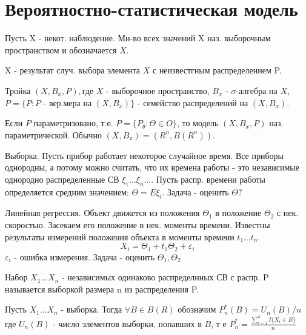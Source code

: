 	\section{Вероятностно-статистическая модель}
	
	\begin{definition}
		Пусть X - некот. наблюдение. Мн-во всех значений X наз. выборочным пространством и обозначается $X$.
	\end{definition}
	X - результат случ. выбора элемента $X$ с неизвестгным распределением P.
	
	\begin{definition}
		Тройка $(X, B_x, P), $где $X$ - выборочное пространство, $B_x$ - $\sigma$-алгебра на $X$,
		$P = \{P: P$ - вер.мера на $(X, B_x)\}$ - семейство распределений  на $(X, B_x)$.
		
	\end{definition}
	
	Если $P$ параметризовано, т.е. $P = \{P_\theta: \Theta \in O\}$, то модель $(X,B_x,P)$ наз. параметрической.
	Обычно $(X,B_x)=(R^n,B(R^n))$.
	
	\begin{example}
			Выборка. Пусть прибор работает некоторое случайное время. Все приборы однородны, а потому можно считать, что их времена работы - 
			это независимые однородно распределенные СВ $\xi_1 \ldots \xi_n \ldots$.
			Пусть распр. времени работы определяется средним значением: $\Theta = E\xi_i$.
			Задача - оценить $\Theta ?$
	\end{example}
	
	\begin{example}
		Линейная регрессия. Объект движется из положения $\Theta_1$ в положение $\Theta_2$ с нек. скоростью.
		Засекаем его положение в нек. моменты времени. Известны результаты измерений положения объекта в моменты времени 
		$t_1 \ldots t_n$.
		$$X_i = \Theta_1 + t_1\Theta_2 + \varepsilon_i$$
		$\varepsilon_i$ - ошибка измерения.
		Задача - оценить $\Theta_1, \Theta_2$
	\end{example}
	
	\begin{definition}
		Набор $X_1 \dots X_n$ - независимых одинаково распределнных СВ с распр. P называется выборкой размера n из распределения P. 
	\end{definition}
	
	\begin{definition}
		Пусть $X_1 \ldots X_n$ - выборка. Тогда $\forall B \in B(R)$ обозначим $P_n^*(B)=U_n(B)/n$
		где $U_n(B)$ - число элементов выборки, попавших в $B$, т е 
		$P_n^* = \frac{\sum_{i=1}^n I\{X_i \in B\}}{n}$
	\end{definition}
	
